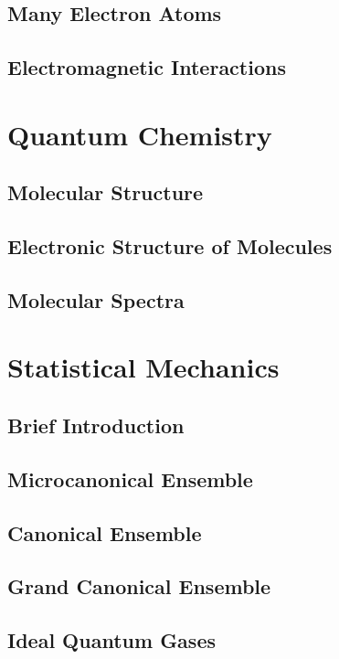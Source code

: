 \documentclass[a4paper, 11pt]{book}
\newcommand{\1}{\opr{\mathds{1}}}
\theoremstyle{plain}
\begin{document}
		\chapter{Many Electron Atoms}
	
		\chapter{Electromagnetic Interactions}
	
\part{Quantum Chemistry}
		\chapter{Molecular Structure}
	
		\chapter{Electronic Structure of Molecules}
	
		\chapter{Molecular Spectra}
	
\part{Statistical Mechanics}
		\chapter{Brief Introduction}
	
		\chapter{Microcanonical Ensemble}
	
		\chapter{Canonical Ensemble}
	
		\chapter{Grand Canonical Ensemble}
	
		\chapter{Ideal Quantum Gases}
	
\end{document}

